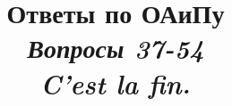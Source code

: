 \documentclass[12pt, a4paper]{extarticle}
\begin{document}
\title{Ответы по ОАиПу \\ {\large \textit{Вопросы 37-54 \\ C'est la fin.}}}
\clearpage\maketitle
\thispagestyle{empty}

\newpage
\tableofcontents
\newpage




\setcounter{section}{36}


% 
\end{document}
